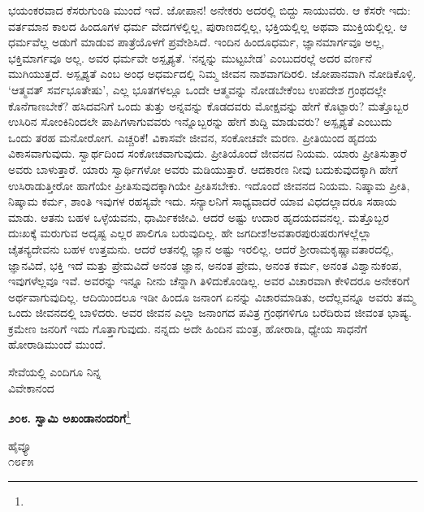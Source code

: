 ಭಯಂಕರವಾದ ಕೆಸರುಗುಂಡಿ ಮುಂದೆ ಇದೆ. ಜೋಪಾನ! ಅನೇಕರು ಅದರಲ್ಲಿ ಬಿದ್ದು ಸಾಯುವರು. ಆ ಕೆಸರೇ ಇದು: ವರ್ತಮಾನ ಕಾಲದ ಹಿಂದೂಗಳ ಧರ್ಮ ವೇದಗಳಲ್ಲಿಲ್ಲ, ಪುರಾಣದಲ್ಲಿಲ್ಲ, ಭಕ್ತಿಯಲ್ಲಿಲ್ಲ ಅಥವಾ ಮುಕ್ತಿಯಲ್ಲಿಲ್ಲ. ಆ ಧರ್ಮವೆಲ್ಲ ಅಡುಗೆ ಮಾಡುವ ಪಾತ್ರೆಯೊಳಗೆ ಪ್ರವೇಶಿಸಿದೆ. ಇಂದಿನ ಹಿಂದೂಧರ್ಮ, ಜ್ಞಾನಮಾರ್ಗವೂ ಅಲ್ಲ, ಭಕ್ತಿಮಾರ್ಗವೂ ಅಲ್ಲ. ಅವರ ಧರ್ಮವೇ ಅಸ್ಪೃಶ್ಯತೆ. `ನನ್ನನ್ನು ಮುಟ್ಟಬೇಡ' ಎಂಬುದರಲ್ಲೆ ಅದರ ವರ್ಣನೆ ಮುಗಿಯುತ್ತದೆ. ಅಸ್ಪೃಶ್ಯತೆ ಎಂಬ ಅಂಧ ಅಧರ್ಮದಲ್ಲಿ ನಿಮ್ಮ ಜೀವನ ನಾಶವಾಗದಿರಲಿ. ಜೋಪಾನವಾಗಿ ನೋಡಿಕೊಳ್ಳಿ. `ಆತ್ಮವತ್ ಸರ್ವಭೂತೇಷು', ಎಲ್ಲ ಭೂತಗಳಲ್ಲೂ ಒಂದೇ ಆತ್ಮವನ್ನು ನೋಡಬೇಕೆಂಬ ಉಪದೇಶ ಗ್ರಂಥದಲ್ಲೇ ಕೊನೆಗಾಣಬೇಕೆ? ಹಸಿದವನಿಗೆ ಒಂದು ತುತ್ತು ಅನ್ನವನ್ನು ಕೊಡದವರು ಮೋಕ್ಷವನ್ನು ಹೇಗೆ ಕೊಟ್ಟಾರು? ಮತ್ತೊಬ್ಬರ ಉಸಿರಿನ ಸೋಂಕಿನಿಂದಲೇ ಪಾಪಿಗಳಾಗುವವರು ಇನ್ನೊಬ್ಬರನ್ನು ಹೇಗೆ ಶುದ್ದಿ ಮಾಡುವರು? ಅಸ್ಪೃಶ್ಯತೆ ಎಂಬುದು ಒಂದು ತರಹ ಮನೋರೋಗ. ಎಚ್ಚರಿಕೆ! ವಿಕಾಸವೇ ಜೀವನ, ಸಂಕೋಚವೇ ಮರಣ. ಪ್ರೀತಿಯಿಂದ ಹೃದಯ ವಿಕಾಸವಾಗುವುದು. ಸ್ವಾರ್ಥದಿಂದ ಸಂಕೋಚವಾಗುವುದು. ಪ್ರೀತಿಯೊಂದೆ ಜೀವನದ ನಿಯಮ. ಯಾರು ಪ್ರೀತಿಸುತ್ತಾರೆ ಅವರು ಬಾಳುತ್ತಾರೆ. ಯಾರು ಸ್ವಾರ್ಥಿಗಳೋ ಅವರು ಮಡಿಯುತ್ತಾರೆ. ಆದಕಾರಣ ನೀವು ಬದುಕುವುದಕ್ಕಾಗಿ ಹೇಗೆ ಉಸಿರಾಡುತ್ತೀರೋ ಹಾಗೆಯೇ ಪ್ರೀತಿಸುವುದಕ್ಕಾಗಿಯೇ ಪ್ರೀತಿಸಬೇಕು. ಇದೊಂದೆ ಜೀವನದ ನಿಯಮ. ನಿಷ್ಕಾಮ ಪ್ರೀತಿ, ನಿಷ್ಕಾಮ ಕರ್ಮ, ಶಾಂತಿ ಇವುಗಳ ರಹಸ್ಯವೇ ಇದು. ಸನ್ಯಾಲನಿಗೆ ಸಾಧ್ಯವಾದರೆ ಯಾವ ವಿಧದಲ್ಲಾದರೂ ಸಹಾಯ ಮಾಡು. ಆತನು ಬಹಳ ಒಳ್ಳೆಯವನು, ಧಾರ್ಮಿಕಜೀವಿ. ಆದರೆ ಅಷ್ಟು ಉದಾರ ಹೃದಯದವನಲ್ಲ. ಮತ್ತೊಬ್ಬರ ದುಃಖಕ್ಕೆ ಮರುಗುವ ಅದೃಷ್ಟ ಎಲ್ಲರ ಪಾಲಿಗೂ ಬರುವುದಿಲ್ಲ. ಹೇ ಜಗದೀಶ!ಅವತಾರಪುರುಷರುಗಳಲ್ಲೆಲ್ಲಾ ಚೈತನ್ಯದೇವನು ಬಹಳ\enginline{-} ಉತ್ತಮನು. ಆದರೆ ಆತನಲ್ಲಿ ಜ್ಞಾನ ಅಷ್ಟು ಇರಲಿಲ್ಲ. ಆದರೆ ಶ‍್ರೀರಾಮಕೃಷ್ಣಾವತಾರದಲ್ಲಿ, ಜ್ಞಾನವಿದೆ, ಭಕ್ತಿ ಇದೆ ಮತ್ತು ಪ್ರೇಮವಿದೆ\enginline{-} ಅನಂತ ಜ್ಞಾನ, ಅನಂತ ಪ್ರೇಮ, ಅನಂತ ಕರ್ಮ, ಅನಂತ ವಿಶ್ವಾನುಕಂಪ, ಇವುಗಳೆಲ್ಲವೂ ಇವೆ. ಅವರನ್ನು ಇನ್ನೂ ನೀನು ಚೆನ್ನಾಗಿ ತಿಳಿದುಕೊಂಡಿಲ್ಲ. ಅವರ ವಿಚಾರವಾಗಿ ಕೇಳಿದರೂ ಅನೇಕರಿಗೆ ಅರ್ಥವಾಗುವುದಿಲ್ಲ. ಆದಿಯಿಂದಲೂ ಇಡೀ ಹಿಂದೂ ಜನಾಂಗ ಏನನ್ನು ವಿಚಾರಮಾಡಿತು, ಅದೆಲ್ಲವನ್ನೂ ಅವರು ತಮ್ಮ ಒಂದು ಜೀವನದಲ್ಲಿ ಬಾಳಿದರು. ಅವರ ಜೀವನ ಎಲ್ಲಾ ಜನಾಂಗದ ಪವಿತ್ರ ಗ್ರಂಥಗಳಿಗೂ ಬರೆದಿರುವ ಜೀವಂತ ಭಾಷ್ಯ. ಕ್ರಮೇಣ ಜನರಿಗೆ ಇದು ಗೊತ್ತಾಗುವುದು. ನನ್ನದು ಅದೇ ಹಿಂದಿನ ಮಂತ್ರ, ಹೋರಾಡಿ, ಧ್ಯೇಯ ಸಾಧನೆಗೆ ಹೋರಾಡಿ\enginline{-}ಮುಂದೆ ಮುಂದೆ.

{\flushright
ಸೇವೆಯಲ್ಲಿ ಎಂದಿಗೂ ನಿನ್ನ\\ವಿವೇಕಾನಂದ\par}

\begin{center}
\textbf{೨೦೮. ಸ್ವಾಮಿ ಅಖಂಡಾನಂದರಿಗೆ}\footnote{}
\end{center}

\vspace{-0.5cm}
	
\begin{flushright}
ಹೈವ್ಯೂ\\೧೮೯೫
\end{flushright}

\vspace{-0.4cm}

